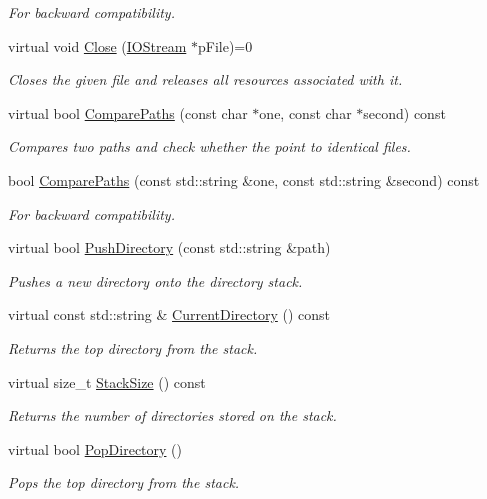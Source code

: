 \begin{DoxyCompactItemize}
\begin{DoxyCompactList}\small\item\em For backward compatibility. \end{DoxyCompactList}\item 
virtual void \hyperlink{class_assimp_1_1_i_o_system_a8c334d60f04bceeb6bd0157d21723f3e}{Close} (\hyperlink{class_assimp_1_1_i_o_stream}{I\-O\-Stream} $\ast$p\-File)=0
\begin{DoxyCompactList}\small\item\em Closes the given file and releases all resources associated with it. \end{DoxyCompactList}\item 
virtual bool \hyperlink{class_assimp_1_1_i_o_system_a11349a65b353ed62f655c3dd802b9062}{Compare\-Paths} (const char $\ast$one, const char $\ast$second) const 
\begin{DoxyCompactList}\small\item\em Compares two paths and check whether the point to identical files. \end{DoxyCompactList}\item 
bool \hyperlink{class_assimp_1_1_i_o_system_a279d1d4b0b2aa37800e222aad508dff1}{Compare\-Paths} (const std\-::string \&one, const std\-::string \&second) const 
\begin{DoxyCompactList}\small\item\em For backward compatibility. \end{DoxyCompactList}\item 
virtual bool \hyperlink{class_assimp_1_1_i_o_system_adf869cb1360e25269cbe7e0c642d2a73}{Push\-Directory} (const std\-::string \&path)
\begin{DoxyCompactList}\small\item\em Pushes a new directory onto the directory stack. \end{DoxyCompactList}\item 
virtual const std\-::string \& \hyperlink{class_assimp_1_1_i_o_system_a02e0689e0092c06659c99698d574a2dd}{Current\-Directory} () const 
\begin{DoxyCompactList}\small\item\em Returns the top directory from the stack. \end{DoxyCompactList}\item 
virtual size\-\_\-t \hyperlink{class_assimp_1_1_i_o_system_aef0a0e3243ae4f077482703e45e08721}{Stack\-Size} () const 
\begin{DoxyCompactList}\small\item\em Returns the number of directories stored on the stack. \end{DoxyCompactList}\item 
virtual bool \hyperlink{class_assimp_1_1_i_o_system_abec511fb877f086dbc063218128d89fb}{Pop\-Directory} ()
\begin{DoxyCompactList}\small\item\em Pops the top directory from the stack. \end{DoxyCompactList}\end{DoxyCompactItemize}


